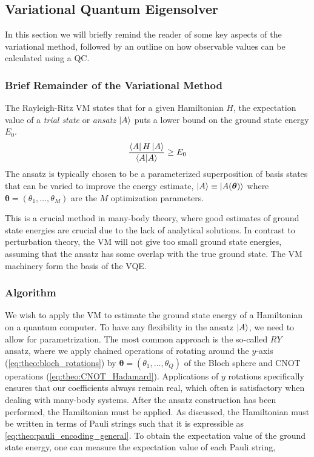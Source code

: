 \subsection{Variational Quantum Eigensolver}
In this section we will briefly remind the reader of some key aspects of the variational method, followed by an outline on how observable values can be calculated using a QC. 

\subsubsection{Brief Remainder of the Variational Method}
The Rayleigh-Ritz VM states that for a given Hamiltonian $H$, the expectation value of a \textit{trial state} or \textit{ansatz} $\ket{A}$ puts a lower bound on the ground state energy $E_0$.
\begin{equation}
    \frac{\bra{A}H\ket{A}}{\ip{A}} \geq E_0
\end{equation}
The ansatz is typically chosen to be a parameterized superposition of basis states that can be varied to improve the energy estimate, $\ket{A}\equiv \ket{A(\boldsymbol{\theta})}$ where $\boldsymbol{\theta} = (\theta_1, \ldots, \theta_M)$ are the $M$ optimization parameters.

This is a crucial method in many-body theory, where good estimates of ground state energies are crucial due to the lack of analytical solutions. In contrast to perturbation theory, the VM will not give too small ground state energies, assuming that the ansatz has some overlap with the true ground state. The VM machinery form the basis of the VQE. 

\subsubsection{Algorithm}
We wish to apply the VM to estimate the ground state energy of a Hamiltonian on a quantum computer. To have any flexibility in the ansatz $\ket{A}$, we need to allow for parametrization. The most common approach is the so-called $RY$ ansatz, where we apply chained operations of rotating around the $y$-axis (\cref{eq:theo:bloch_rotations}) by $\boldsymbol{\theta} = (\theta_1,\ldots,\theta_Q)$ of the Bloch sphere and CNOT operations (\cref{eq:theo:CNOT_Hadamard}). Applications of $y$ rotations specifically ensures that our coefficients always remain real, which often is satisfactory when dealing with many-body systems. 
\newline
After the ansatz construction has been performed, the Hamiltonian must be applied. As discussed, the Hamiltonian must be written in terms of Pauli strings such that it is expressible as \cref{eq:theo:pauli_encoding_general}. To obtain the expectation value of the ground state energy, one can measure the expectation value of each Pauli string,

